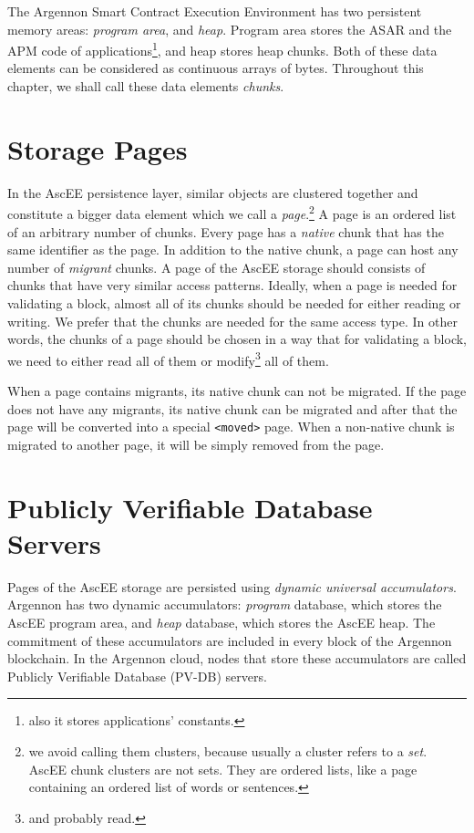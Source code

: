 
The Argennon Smart Contract Execution Environment has two persistent memory areas: \emph{program area}, and \emph{heap}.
Program area stores the ASAR and the APM code of
applications\footnote{also it stores applications' constants.}, and heap stores heap chunks.
Both of these data elements can be considered as continuous arrays of bytes.
Throughout this chapter, we shall call these data elements \emph{chunks}.


\section{Storage Pages}\label{sec:storage-pages}

In the AscEE persistence layer, similar objects are clustered together and constitute a bigger data element which we
call a \emph{page}.\footnote{we avoid calling them clusters, because usually a cluster refers to a \emph{set}. AscEE
chunk clusters are not sets. They are ordered lists, like a page containing an ordered list of words or sentences.}
A page is an ordered list of an arbitrary number of chunks. Every page has a \emph{native} chunk that has the same
identifier as the page. In addition to the native chunk, a page can host any number of \emph{migrant} chunks.
A page of the AscEE storage should consists of chunks that have very similar access patterns. Ideally, when a page is
needed for validating a block, almost all of its chunks should be needed for either reading or writing. We prefer
that the chunks are needed for the same access type. In other words, the chunks of a page should be chosen in a way that
for validating a block, we need to either read all of them or modify\footnote{and probably read.} all of them.

When a page contains migrants, its native chunk can not be migrated. If the page does not
have any migrants, its native chunk can be migrated and after that the page will be converted into a special
\texttt{<moved>} page. When a non-native chunk is migrated to another page, it will be simply removed from the page.

\section{Publicly Verifiable Database Servers}\label{sec:zk-edb}

Pages of the AscEE storage are persisted using \emph{dynamic universal accumulators}. Argennon
has two dynamic accumulators: \emph{program} database, which stores the AscEE program area, and \emph{heap} database,
which stores the AscEE heap. The commitment of these accumulators are included in every block of the Argennon
blockchain. In the Argennon cloud, nodes that store these accumulators are called Publicly Verifiable Database
(PV-DB) servers.

